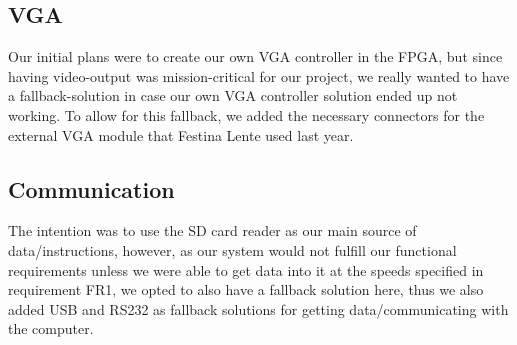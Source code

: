 \subsection{VGA}
Our initial plans were to create our own \ac{VGA} controller in the \ac{FPGA}, but since having video-output was mission-critical
for our project, we really wanted to have a fallback-solution in case our own
\ac{VGA} controller solution ended up not working.
To allow for this fallback, we added the necessary connectors for the external \ac{VGA} module that Festina Lente used last year.

\subsection {Communication}
The intention was to use the \ac{SD} card reader as our main source of data/instructions, however, as our system would
not fulfill our functional requirements unless we were able to get data into it at the speeds specified in requirement
FR1, we opted to also have a fallback
solution here, thus we also added \ac{USB} and RS232 as fallback solutions for getting data/communicating with the
computer.
